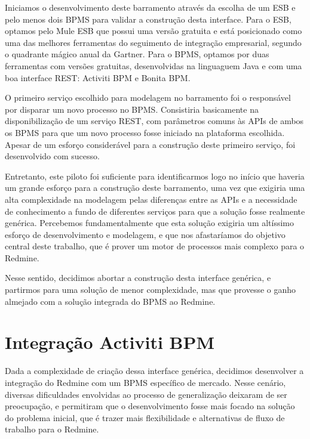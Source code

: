 Iniciamos o desenvolvimento deste barramento através da escolha de um ESB e pelo menos dois BPMS para validar a construção desta interface. Para o ESB, optamos pelo Mule ESB\cite{mule} que possui uma versão gratuita e está posicionado como uma das melhores ferramentas do seguimento de integração empresarial, segundo o quadrante mágico anual da Gartner\cite{mule_gartner}. Para o BPMS, optamos por duas ferramentas com versões gratuitas, desenvolvidas na linguaguem Java e com uma boa interface REST: Activiti BPM\cite{bpm_activiti} e Bonita BPM\cite{bpm_bonita}.

O primeiro serviço escolhido para modelagem no barramento foi o responsável por disparar um novo processo no BPMS. Consistiria basicamente na disponibilização de um serviço REST, com parâmetros comuns às APIs de ambos os BPMS para que um novo processo fosse iniciado na plataforma escolhida. Apesar de um esforço considerável para a construção deste primeiro serviço, foi desenvolvido com sucesso.  

Entretanto, este piloto foi suficiente para identificarmos logo no início que haveria um grande esforço para a construção deste barramento, uma vez que exigiria uma alta complexidade na modelagem pelas diferenças entre as APIs e a necessidade de conhecimento a fundo de diferentes serviços para que a solução fosse realmente genérica. Percebemos fundamentalmente que esta solução exigiria um altíssimo esforço de desenvolvimento e modelagem, e que nos afastaríamos do objetivo central deste trabalho, que é prover um motor de processos mais complexo para o Redmine. 

Nesse sentido, decidimos abortar a construção desta interface genérica, e partirmos para uma solução de menor complexidade, mas que provesse o ganho almejado com a solução integrada do BPMS ao Redmine.

\section{Integração Activiti BPM}\label{sec:cenario-integracao-activiti}

Dada a complexidade de criação dessa interface genérica, decidimos desenvolver a integração do Redmine com um BPMS específico de mercado. Nesse cenário, diversas dificuldades envolvidas ao processo de generalização deixaram de ser preocupação, e permitiram que o desenvolvimento fosse mais focado na solução do problema inicial, que é trazer mais flexibilidade e alternativas de fluxo de trabalho para o Redmine.

